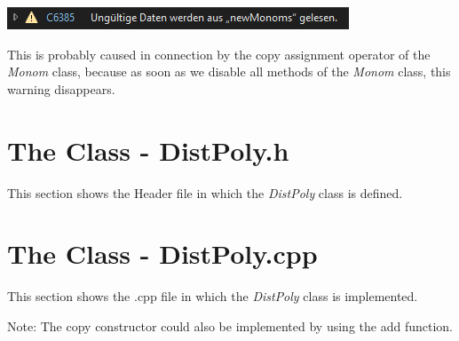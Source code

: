 \documentclass[11pt,titlepage]{article}
\def\StartLineAt#1{\lstset{firstnumber=#1}}
\begin{document}
			\includegraphics[scale=1.5]{Documentation/warning-line297.png}
		
		\StartLineAt{281}	
		
		
		This is probably caused in connection by the copy assignment operator of the \emph{Monom} class, because as soon as we disable all methods of the \emph{Monom} class, this warning disappears.
		
	
\newpage
		
	\section{The Class - DistPoly.h}
	This section shows the Header file in which the \emph{DistPoly} class is defined.
	
		
	
\newpage
	\section{The Class - DistPoly.cpp}
		This section shows the .cpp file in which the \emph{DistPoly} class is implemented.
		
		Note: The copy constructor could also be implemented by using the add function.	
		
			
\end{document}
